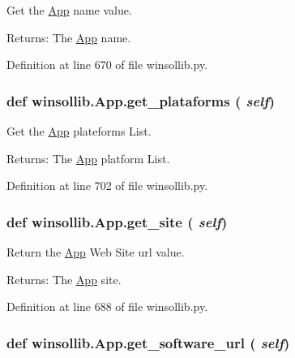 Get the \hyperlink{classwinsollib_1_1App}{App} name value. 

\begin{Desc}
\item[Returns:]The \hyperlink{classwinsollib_1_1App}{App} name. \end{Desc}


Definition at line 670 of file winsollib.py.\hypertarget{classwinsollib_1_1App_897de56ff07a039d94bace089a75224f}{
\subsubsection[get\_\-plataforms]{\setlength{\rightskip}{0pt plus 5cm}def winsollib.App.get\_\-plataforms ( {\em self})}}
\label{classwinsollib_1_1App_897de56ff07a039d94bace089a75224f}


Get the \hyperlink{classwinsollib_1_1App}{App} plateforms List. 

\begin{Desc}
\item[Returns:]The \hyperlink{classwinsollib_1_1App}{App} platform List. \end{Desc}


Definition at line 702 of file winsollib.py.\hypertarget{classwinsollib_1_1App_7fe30d22b3992092349061f1692edb3e}{
\subsubsection[get\_\-site]{\setlength{\rightskip}{0pt plus 5cm}def winsollib.App.get\_\-site ( {\em self})}}
\label{classwinsollib_1_1App_7fe30d22b3992092349061f1692edb3e}


Return the \hyperlink{classwinsollib_1_1App}{App} Web Site url value. 

\begin{Desc}
\item[Returns:]The \hyperlink{classwinsollib_1_1App}{App} site. \end{Desc}


Definition at line 688 of file winsollib.py.\hypertarget{classwinsollib_1_1App_78e363a0bbbae0c96bfec25b7ff91137}{
\subsubsection[get\_\-software\_\-url]{\setlength{\rightskip}{0pt plus 5cm}def winsollib.App.get\_\-software\_\-url ( {\em self})}}
\label{classwinsollib_1_1App_78e363a0bbbae0c96bfec25b7ff91137}


